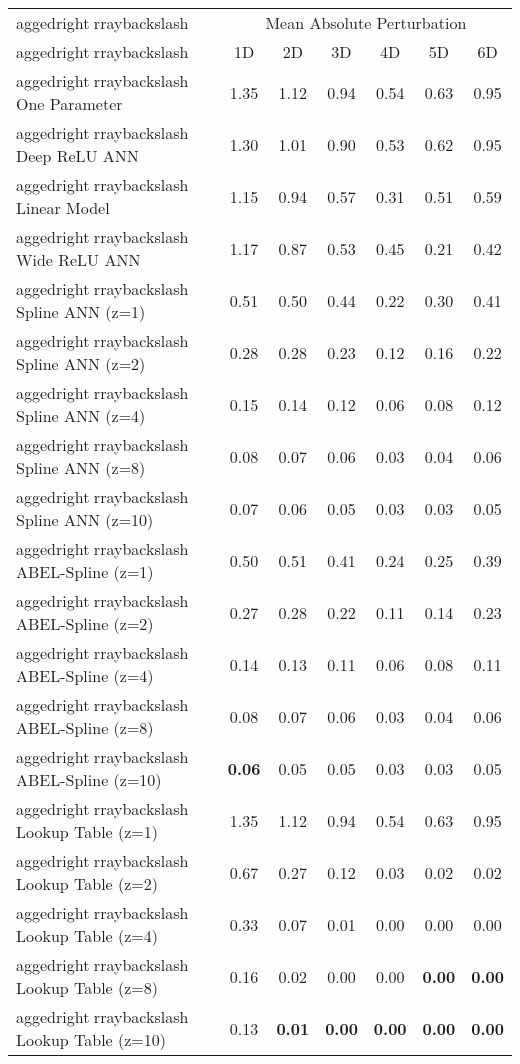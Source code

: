 \begin{table}
\centering
\begin{tabular}{|>{
aggedrightrraybackslash}p{5cm}|c|c|c|c|c|c|}
\hline
\multicolumn{1}{|c|}{Model} & \multicolumn{6}{c|}{Mean Absolute Perturbation} \\ \cline{2-7}
& 1D & 2D & 3D & 4D & 5D & 6D \\ \hline
One Parameter & 1.35 & 1.12 & 0.94 & 0.54 & 0.63 & 0.95 \\ \hline
Deep ReLU ANN & 1.30 & 1.01 & 0.90 & 0.53 & 0.62 & 0.95 \\ \hline
Linear Model & 1.15 & 0.94 & 0.57 & 0.31 & 0.51 & 0.59 \\ \hline
Wide ReLU ANN & 1.17 & 0.87 & 0.53 & 0.45 & 0.21 & 0.42 \\ \hline
Spline ANN (z=1) & 0.51 & 0.50 & 0.44 & 0.22 & 0.30 & 0.41 \\ \hline
Spline ANN (z=2) & 0.28 & 0.28 & 0.23 & 0.12 & 0.16 & 0.22 \\ \hline
Spline ANN (z=4) & 0.15 & 0.14 & 0.12 & 0.06 & 0.08 & 0.12 \\ \hline
Spline ANN (z=8) & 0.08 & 0.07 & 0.06 & 0.03 & 0.04 & 0.06 \\ \hline
Spline ANN (z=10) & 0.07 & 0.06 & 0.05 & 0.03 & 0.03 & 0.05 \\ \hline
ABEL-Spline (z=1) & 0.50 & 0.51 & 0.41 & 0.24 & 0.25 & 0.39 \\ \hline
ABEL-Spline (z=2) & 0.27 & 0.28 & 0.22 & 0.11 & 0.14 & 0.23 \\ \hline
ABEL-Spline (z=4) & 0.14 & 0.13 & 0.11 & 0.06 & 0.08 & 0.11 \\ \hline
ABEL-Spline (z=8) & 0.08 & 0.07 & 0.06 & 0.03 & 0.04 & 0.06 \\ \hline
ABEL-Spline (z=10) & \textbf{0.06} & 0.05 & 0.05 & 0.03 & 0.03 & 0.05 \\ \hline
Lookup Table (z=1) & 1.35 & 1.12 & 0.94 & 0.54 & 0.63 & 0.95 \\ \hline
Lookup Table (z=2) & 0.67 & 0.27 & 0.12 & 0.03 & 0.02 & 0.02 \\ \hline
Lookup Table (z=4) & 0.33 & 0.07 & 0.01 & 0.00 & 0.00 & 0.00 \\ \hline
Lookup Table (z=8) & 0.16 & 0.02 & 0.00 & 0.00 & \textbf{0.00} & \textbf{0.00} \\ \hline
Lookup Table (z=10) & 0.13 & \textbf{0.01} & \textbf{0.00} & \textbf{0.00} & \textbf{0.00} & \textbf{0.00} \\ \hline
\end{tabular}
\end{table}
